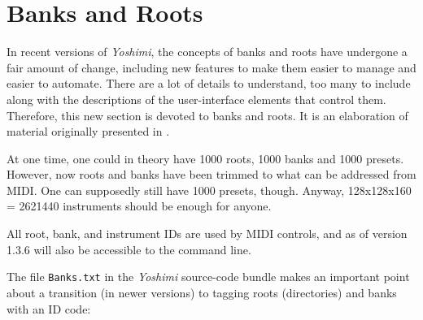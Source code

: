 %
%
%

\section{Banks and Roots}
\label{sec:banks_and_roots}

   In recent versions of \textsl{Yoshimi}, the concepts of banks and roots
   have undergone a fair amount of change, including new features to make
   them easier to manage and easier to automate.  There are a lot of details
   to understand, too many to include along with the descriptions of the
   user-interface elements that control them.
   Therefore, this new section is devoted to banks and roots.
   It is an elaboration of material originally presented in
   .

   At one time, one could in theory have 1000 roots, 1000 banks and 1000
   presets.  However, now roots and banks have been trimmed to what can be
   addressed from MIDI. One can supposedly still have 1000 presets, though.
   Anyway, 128x128x160 = 2621440 instruments should be enough for anyone.

   All root, bank, and instrument IDs are used by MIDI controls, and as of
   version 1.3.6 will also be accessible to the command line.

   The file \texttt{Banks.txt} in the \textsl{Yoshimi} source-code bundle
   makes an important point about a transition (in newer versions)
   to tagging roots (directories) and banks with an ID code:

